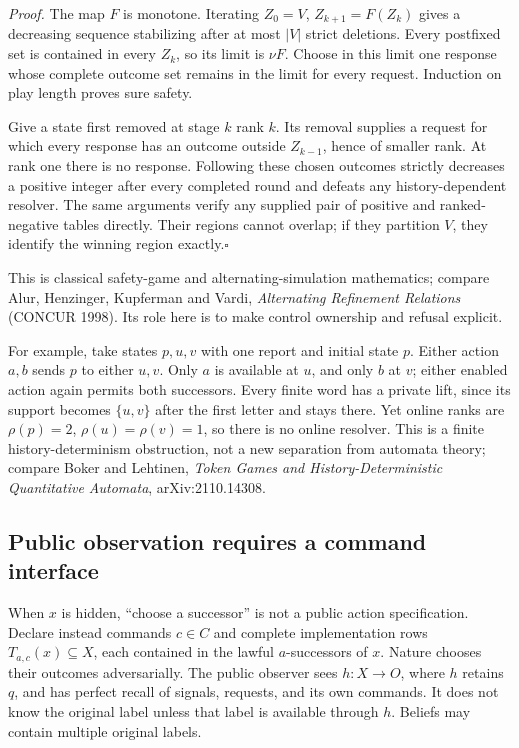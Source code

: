 \emph{Proof.}
The map $F$ is monotone. Iterating $Z_0=V$, $Z_{k+1}=F(Z_k)$ gives a decreasing
sequence stabilizing after at most $|V|$ strict deletions. Every postfixed set
is contained in every $Z_k$, so its limit is $\nu F$. Choose in this limit one
response whose complete outcome set remains in the limit for every request.
Induction on play length proves sure safety.

Give a state first removed at stage $k$ rank $k$. Its removal supplies a
request for which every response has an outcome outside $Z_{k-1}$, hence of
smaller rank. At rank one there is no response. Following these chosen outcomes
strictly decreases a positive integer after every completed round and defeats
any history-dependent resolver. The same arguments verify any supplied pair
of positive and ranked-negative tables directly. Their regions cannot overlap;
if they partition $V$, they identify the winning region exactly.\hfill$\square$

This is classical safety-game and alternating-simulation mathematics; compare
Alur, Henzinger, Kupferman and Vardi, \emph{Alternating Refinement Relations}
(CONCUR 1998). Its role here is to make control ownership and refusal explicit.

For example, take states $p,u,v$ with one report and initial state $p$.
Either action $a,b$ sends $p$ to either $u,v$. Only $a$ is available at $u$,
and only $b$ at $v$; either enabled action again permits both successors.
Every finite word has a private lift, since its support becomes $\{u,v\}$
after the first letter and stays there. Yet online ranks are
$\rho(p)=2$, $\rho(u)=\rho(v)=1$, so there is no online resolver. This is a
finite history-determinism obstruction, not a new separation from automata
theory; compare Boker and Lehtinen, \emph{Token Games and History-Deterministic
Quantitative Automata}, arXiv:2110.14308.

\subsection{Public observation requires a command interface}
\label{online-public-command-interface}

When $x$ is hidden, ``choose a successor'' is not a public action specification.
Declare instead commands $c\in C$ and complete implementation rows
$T_{a,c}(x)\subseteq X$, each contained in the lawful $a$-successors of $x$.
Nature chooses their outcomes adversarially. The public observer sees
$h:X\to O$, where $h$ retains $q$, and has perfect recall of signals, requests,
and its own commands. It does not know the original label unless that label
is available through $h$. Beliefs may contain multiple original labels.

